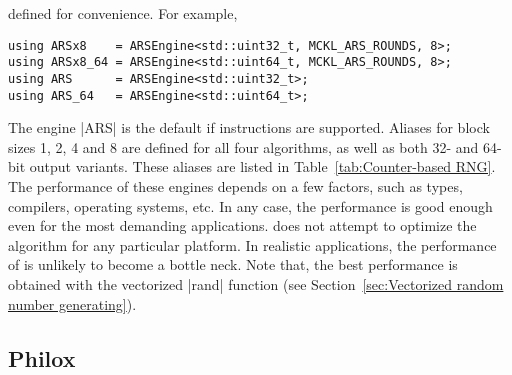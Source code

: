 defined for convenience. For example,
\begin{Verbatim}
using ARSx8    = ARSEngine<std::uint32_t, MCKL_ARS_ROUNDS, 8>;
using ARSx8_64 = ARSEngine<std::uint64_t, MCKL_ARS_ROUNDS, 8>;
using ARS      = ARSEngine<std::uint32_t>;
using ARS_64   = ARSEngine<std::uint64_t>;
\end{Verbatim}
The engine |ARS| is the default \rng if \aesni instructions are supported.
Aliases for block sizes 1, 2, 4 and 8 are defined for all four algorithms, as
well as both 32- and 64-bit output variants. These aliases are listed in
Table~\ref{tab:Counter-based RNG}. The performance of these engines depends on
a few factors, such as \cpu types, compilers, operating systems, etc. In any
case, the performance is good enough even for the most demanding applications.
\mckl does not attempt to optimize the algorithm for any particular platform.
In realistic applications, the performance of \rng is unlikely to become a
bottle neck. Note that, the best performance is obtained with the vectorized
|rand| function (see Section~\ref{sec:Vectorized random number generating}).

\subsection{Philox}
\label{sub:Philox}


